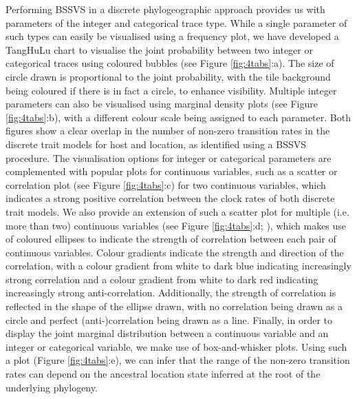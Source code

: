 \documentclass{bioinfo}
\begin{document}
Performing BSSVS in a discrete phylogeographic approach provides us with parameters of the integer and categorical trace type.
While a single parameter of such types can easily be visualised using a frequency plot, we have developed a TangHuLu chart to visualise the joint probability between two integer or categorical traces using coloured bubbles (see Figure \ref{fig:4tabs}:a).
The size of circle drawn is proportional to the joint probability, %
with the tile background being coloured if there is in fact a circle, to enhance visibility. 
Multiple integer parameters can also be visualised using marginal density plots (see Figure \ref{fig:4tabs}:b), with a different colour scale being assigned to each parameter.
Both figures show a clear overlap in the number of non-zero transition rates in the discrete trait models for host and location, as identified using a BSSVS procedure.
The visualisation options for integer or categorical parameters are complemented with popular plots for continuous variables, such as a scatter or correlation plot (see Figure \ref{fig:4tabs}:c) for two continuous variables, which indicates a strong positive correlation between the clock rates of both discrete trait models. 
We also provide an extension of such a scatter plot for multiple (i.e. more than two) continuous variables (see Figure \ref{fig:4tabs}:d; \citet{Murdoch}), which makes use of coloured ellipses to indicate the strength of correlation between each pair of continuous variables.
Colour gradients indicate the strength and direction of the correlation, with a colour gradient from white to dark blue indicating increasingly strong correlation and a colour gradient from white to dark red indicating increasingly strong anti-correlation.
Additionally, the strength of correlation is reflected in the shape of the ellipse drawn, with no correlation being drawn as a circle and perfect (anti-)correlation being drawn as a line.
Finally, in order to display the joint marginal distribution between a continuous variable and an integer or categorical variable, we make use of box-and-whisker plots.
Using such a plot (Figure \ref{fig:4tabs}:e), we can infer that the range of the non-zero transition rates can depend on the ancestral location state inferred at the root of the underlying phylogeny.
\end{document}
